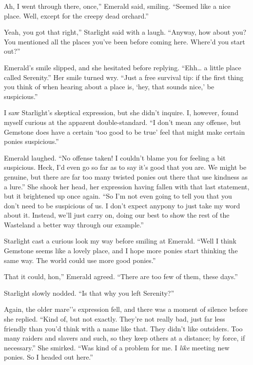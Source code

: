 \leavevmode{}Ah, I went through there, once,” Emerald said, smiling. “Seemed like a nice place. Well, except for the creepy dead orchard.”

\leavevmode{}Yeah, you got that right,” Starlight said with a laugh. “Anyway, how about you? You mentioned all the places you’ve been before coming here. Where’d you start out?”

Emerald’s smile slipped, and she hesitated before replying. “Ehh… a little place called Serenity.” Her smile turned wry. “Just a free survival tip: if the first thing you think of when hearing about a place is, ‘hey, that sounds nice,’ be suspicious.”

I saw Starlight’s skeptical expression, but she didn’t inquire. I, however, found myself curious at the apparent double-standard. “I don’t mean any offense, but Gemstone does have a certain ‘too good to be true’ feel that might make certain ponies suspicious.”

Emerald laughed. “No offense taken! I couldn’t blame you for feeling a bit suspicious. Heck, I’d even go so far as to say it’s good that you are. We might be genuine, but there are far too many twisted ponies out there that use kindness as a lure.” She shook her head, her expression having fallen with that last statement, but it brightened up once again. “So I’m not even going to tell you that you don’t need to be suspicious of us. I don’t expect anypony to just take my word about it. Instead, we’ll just carry on, doing our best to show the rest of the Wasteland a better way through our example.”

Starlight cast a curious look my way before smiling at Emerald. “Well I think Gemstone seems like a lovely place, and I hope more ponies start thinking the same way. The world could use more good ponies.”

\leavevmode{}That it could, hon,” Emerald agreed. “There are too few of them, these days.”

Starlight slowly nodded. “Is that why you left Serenity?”

Again, the older mare’’s expression fell, and there was a moment of silence before she replied. “Kind of, but not exactly. They’re not really bad, just far less friendly than you’d think with a name like that. They didn’t like outsiders. Too many raiders and slavers and such, so they keep others at a distance; by force, if necessary.” She smirked. “Was kind of a problem for me. I \textit{like} meeting new ponies. So I headed out here.”

